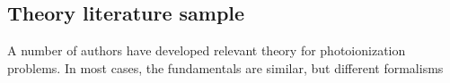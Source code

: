 \subsection{Theory literature sample\label{sec:theory-lit}}

A number of authors have developed relevant theory for photoionization problems. In most cases, the fundamentals are similar, but different formalisms 